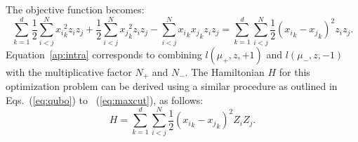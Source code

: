 \documentclass[showpacs,twocolumn,superscriptaddress]{revtex4-2}
\begin{document}
The objective function becomes:
\begin{equation}
    \sum_{k=1}^d \frac{1}{2}\sum_{i<j}^N {x_i}_k^2 z_iz_j + \frac{1}{2}\sum_{i<j}^N {x_j}_k^2z_iz_j - \sum_{i<j}^N {x_i}_k{x_j}_k z_i z_j
    \label{ap:intra}
    = \sum_{k=1}^d \sum_{i<j}^N \frac{1}{2} ({x_i}_k-{x_j}_k)^2 z_i z_j.
\end{equation}
Equation~\eqref{ap:intra} corresponds to combining $l(\mu_+,z,+1)$ and $l(\mu_-,z,-1)$ with the multiplicative factor $N_+$ and $N_-$. The Hamiltonian $H$ for this optimization problem can be derived using a similar procedure as outlined in Eqs.~(\ref{eq:qubo}) to ~(\ref{eq:maxcut}), as follows:
\begin{equation}
    H = \sum_{k=1}^d \sum_{i<j}^N \frac{1}{2} ({x_i}_k-{x_j}_k)^2 Z_i Z_j.
\end{equation}
\end{document}
